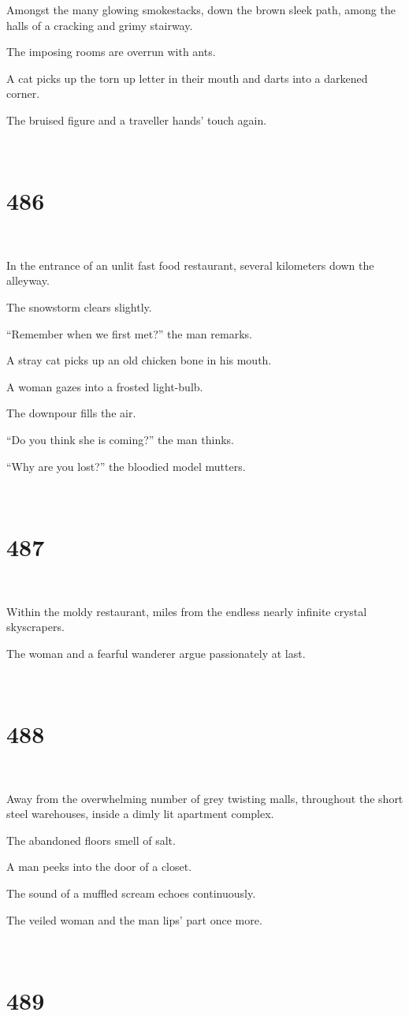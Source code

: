 \documentclass{report}
\begin{document}
Amongst the many glowing smokestacks, down the brown sleek path, among the halls of a cracking and grimy stairway.

The imposing rooms are overrun with ants.

A cat picks up the torn up letter in their mouth and darts into a darkened corner.

The bruised figure and a traveller hands' touch again.

~
\chapter*{486}
~

In the entrance of an unlit fast food restaurant, several kilometers down the alleyway.

The snowstorm clears slightly.

``Remember when we first met?'' the man remarks.

A stray cat picks up an old chicken bone in his mouth.

A woman gazes into a frosted light-bulb.

The downpour fills the air.

``Do you think she is coming?'' the man thinks.

``Why are you lost?'' the bloodied model mutters.

~
\chapter*{487}
~

Within the moldy restaurant, miles from the endless nearly infinite crystal skyscrapers.

The woman and a fearful wanderer argue passionately at last.

~
\chapter*{488}
~

Away from the overwhelming number of grey twisting malls, throughout the short steel warehouses, inside a dimly lit apartment complex.

The abandoned floors smell of salt.

A man peeks into the door of a closet.

The sound of a muffled scream echoes continuously.

The veiled woman and the man lips' part once more.

~
\chapter*{489}
~
\end{document}
